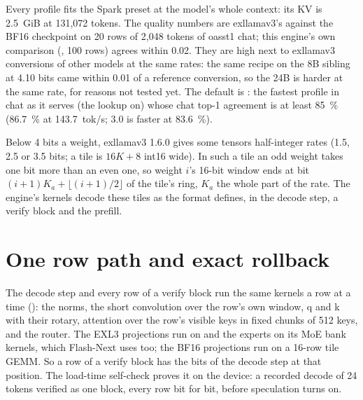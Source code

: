 Every profile fits the Spark preset at the model's whole context: its KV is 2.5~GiB at 131,072 tokens. The quality numbers are exllamav3's  against the BF16 checkpoint on 20 rows of 2,048 tokens of oasst1 chat; this engine's own comparison (, 100 rows) agrees within 0.02. They are high next to exllamav3 conversions of other models at the same rates: the same recipe on the 8B sibling at 4.10 bits came within 0.01 of a reference conversion, so the 24B is harder at the same rate, for reasons not tested yet. The default is : the fastest profile in chat as it serves (the lookup on) whose chat top-1 agreement is at least 85~\% (86.7~\% at 143.7~tok/s; 3.0 is faster at 83.6~\%).



Below 4 bits a weight, exllamav3 1.6.0 gives some tensors half-integer rates (1.5, 2.5 or 3.5 bits; a tile is $16K + 8$ int16 wide). In such a tile an odd weight takes one bit more than an even one, so weight $i$'s 16-bit window ends at bit $(i+1)K_a + \lfloor (i+1)/2 \rfloor$ of the tile's ring, $K_a$ the whole part of the rate. The engine's kernels decode these tiles as the format defines, in the decode step, a verify block and the prefill.

\section{One row path and exact rollback}

The decode step and every row of a verify block run the same kernels a row at a time (): the norms, the short convolution over the row's own window, q and k with their rotary, attention over the row's visible keys in fixed chunks of 512 keys, and the router. The EXL3 projections run on  and the experts on its MoE bank kernels, which Flash-Next uses too; the BF16 projections run on a 16-row tile GEMM. So a row of a verify block has the bits of the decode step at that position. The load-time self-check proves it on the device: a recorded decode of 24 tokens verified as one block, every row bit for bit, before speculation turns on.

